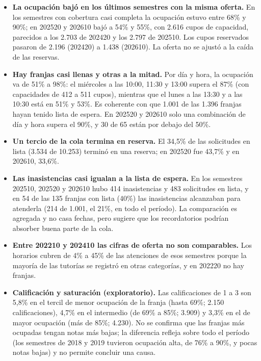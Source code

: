 \documentclass[11pt,letterpaper]{article}
\begin{document}
\begin{itemize}[leftmargin=1.5em,itemsep=2pt]
\item \textbf{La ocupación bajó en los últimos semestres con la misma oferta.} En los semestres con cobertura casi completa la ocupación estuvo entre 68\% y 90\%; en 202520 y 202610 bajó a 54\% y 55\%, con 2.616 cupos de capacidad, parecidos a los 2.703 de 202420 y los 2.797 de 202510. Los cupos reservados pasaron de 2.196 (202420) a 1.438 (202610). La oferta no se ajustó a la caída de las reservas.
\item \textbf{Hay franjas casi llenas y otras a la mitad.} Por día y hora, la ocupación va de 51\% a 98\%: el miércoles a las 10:00, 11:30 y 13:00 supera el 87\% (con capacidades de 412 a 511 cupos), mientras que el lunes a las 13:30 y a las 10:30 está en 51\% y 53\%. Es coherente con que 1.001 de las 1.396 franjas hayan tenido lista de espera. En 202520 y 202610 solo una combinación de día y hora supera el 90\%, y 30 de 65 están por debajo del 50\%.
\item \textbf{Un tercio de la cola termina en reserva.} El 34,5\% de las solicitudes en lista (3.534 de 10.253) terminó en una reserva; en 202520 fue 43,7\% y en 202610, 33,6\%.
\item \textbf{Las inasistencias casi igualan a la lista de espera.} En los semestres 202510, 202520 y 202610 hubo 414 inasistencias y 483 solicitudes en lista, y en 54 de las 135 franjas con lista (40\%) las inasistencias alcanzaban para atenderla (214 de 1.001, el 21\%, en todo el período). La comparación es agregada y no casa fechas, pero sugiere que los recordatorios podrían absorber buena parte de la cola.
\item \textbf{Entre 202210 y 202410 las cifras de oferta no son comparables.} Los horarios cubren de 4\% a 45\% de las atenciones de esos semestres porque la mayoría de las tutorías se registró en otras categorías, y en 202220 no hay franjas.
\item \textbf{Calificación y saturación (exploratorio).} Las calificaciones de 1 a 3 son 5,8\% en el tercil de menor ocupación de la franja (hasta 69\%; 2.150 calificaciones), 4,7\% en el intermedio (de 69\% a 85\%; 3.909) y 3,3\% en el de mayor ocupación (más de 85\%; 4.230). No se confirma que las franjas más ocupadas tengan notas más bajas; la diferencia refleja sobre todo el período (los semestres de 2018 y 2019 tuvieron ocupación alta, de 76\% a 90\%, y pocas notas bajas) y no permite concluir una causa.
\end{itemize}
\end{document}
